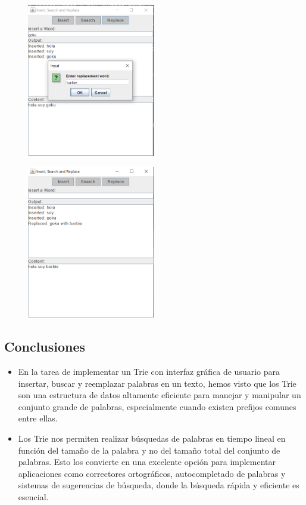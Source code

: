 \documentclass{article}
\begin{document}
\begin{itemize}
		\begin{figure}[H]
		\centering
		\includegraphics[width=0.5\textwidth, height=0.5\textwidth,keepaspectratio]{pruebas/replace1.png}
		\end{figure}
		\begin{figure}[H]
		\centering
		\includegraphics[width=0.5\textwidth, height=0.5\textwidth,keepaspectratio]{pruebas/replace2.png}
		\end{figure}
		\clearpage
		

	\end{itemize}
	\subsection{Conclusiones}
	\begin{itemize}
		\item En la tarea de implementar un Trie con interfaz gráfica de usuario para insertar, buscar y reemplazar palabras en un texto, hemos visto que los Trie son una estructura de datos altamente eficiente para manejar y manipular un conjunto grande de palabras, especialmente cuando existen prefijos comunes entre ellas.

		\item Los Trie nos permiten realizar búsquedas de palabras en tiempo lineal en función del tamaño de la palabra y no del tamaño total del conjunto de palabras. Esto los convierte en una excelente opción para implementar aplicaciones como correctores ortográficos, autocompletado de palabras y sistemas de sugerencias de búsqueda, donde la búsqueda rápida y eficiente es esencial.
	\end{itemize}
\end{document}
